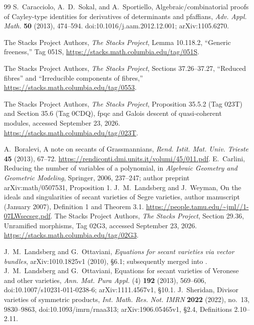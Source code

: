 \begin{thebibliography}{99}
S.~Caracciolo, A.~D.~Sokal, and A.~Sportiello,
Algebraic/combinatorial proofs of Cayley-type identities for derivatives
of determinants and pfaffians,
\emph{Adv. Appl. Math.} \textbf{50} (2013), 474--594.
doi:10.1016/j.aam.2012.12.001; arXiv:1105.6270.

The Stacks Project Authors,
\emph{The Stacks Project}, Lemma 10.118.2, ``Generic freeness,''
Tag 051S, \url{https://stacks.math.columbia.edu/tag/051S}.

The Stacks Project Authors,
\emph{The Stacks Project}, Sections 37.26--37.27,
``Reduced fibres'' and ``Irreducible components of fibres,''
\url{https://stacks.math.columbia.edu/tag/0553}.

The Stacks Project Authors,
\emph{The Stacks Project}, Proposition 35.5.2 (Tag 023T) and
Section 35.6 (Tag 0CDQ), fpqc and Galois descent of quasi-coherent
modules, accessed September 23, 2026.
\url{https://stacks.math.columbia.edu/tag/023T}.


A.~Boralevi, A note on secants of Grassmannians,
\emph{Rend. Istit. Mat. Univ. Trieste} \textbf{45} (2013), 67--72.
\url{https://rendiconti.dmi.units.it/volumi/45/011.pdf}.
E.~Carlini, Reducing the number of variables of a polynomial,
in \emph{Algebraic Geometry and Geometric Modeling}, Springer, 2006,
237--247; author preprint arXiv:math/0507531, Proposition 1.
J.~M.~Landsberg and J.~Weyman, On the ideals and singularities of
secant varieties of Segre varieties, author manuscript (January 2007),
Definition 1 and Theorem 3.1.
\url{https://people.tamu.edu/~jml//1-07LWsecseg.pdf}.
The Stacks Project Authors, \emph{The Stacks Project}, Section 29.36,
Unramified morphisms, Tag 02G3, accessed September 23, 2026.
\url{https://stacks.math.columbia.edu/tag/02G3}.

J.~M.~Landsberg and G.~Ottaviani,
\emph{Equations for secant varieties via vector bundles},
arXiv:1010.1825v1 (2010), \S6.1; subsequently merged into
\cite{LandsbergOttaviani}.
J.~M.~Landsberg and G.~Ottaviani,
Equations for secant varieties of Veronese and other varieties,
\emph{Ann. Mat. Pura Appl.} (4) \textbf{192} (2013), 569--606,
doi:10.1007/s10231-011-0238-6; arXiv:1111.4567v1, \S10.1.
J.~Sheridan, Divisor varieties of symmetric products,
\emph{Int. Math. Res. Not. IMRN} \textbf{2022} (2022), no.~13,
9830--9863, doi:10.1093/imrn/rnaa313;
arXiv:1906.05465v1, \S2.4, Definitions 2.10--2.11.


\end{thebibliography}
